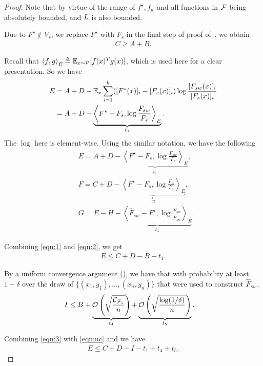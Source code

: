 \begin{proof}

Note that by virtue of the range of $f^\star, f_w$ and all functions in $\mathcal{F}$ being absolutely bounded, and $L$ is also bounded.

Due to $F^\star \notin V_s$, we replace $F^\star$ with $F_s$ in the final step of proof of~, we obtain
\begin{align}
    C \ge A + B. \label{eqn:1}
\end{align}

Recall that $\left \langle f,g \right \rangle_E \triangleq \mathbb{E}_{x \sim \mathcal{P}} [f(x)^Tg(x)]$, which is used here for a clear presentation. So we have
\begin{align*}
    E & = A + D - \mathbb{E}_x \sum_{i=1}^k ([F^\star(x)]_i-[F_s(x)]_i)\log \frac{[F_{sw}(x)]_i}{[F_s(x)]_i}
    \\ & = A + D - \underbrace{\left \langle F^\star-F_s, \log \frac{F_{sw}}{F_s} \right \rangle_E}_{t_1}.
\end{align*}
The $\log$ here is element-wise.
Using the similar notation, we have the following 
\begin{align}
    & E = A + D - \underbrace{\left \langle F^\star-F_s, \log \frac{F_{sw}}{F_s} \right \rangle_E}_{t_1}, \label{eqn:2}\\ 
    & F = C + D - \underbrace{\left \langle F^\star-F_s, \log \frac{F_w}{F_s} \right \rangle_E}_{t_2}, \label{eqn:2-1} \\
    & G = E - H - \underbrace{\left \langle \hat{F}_{sw}-F^\star, \log \frac{F_{sw}}{\hat{F}_{sw}} \right \rangle_E}_{t_3} \label{eqn:2-2}. 
\end{align}

Combining \eqref{eqn:1} and \eqref{eqn:2}, we get
\begin{align}
    E \le C + D - B - t_1. \label{eqn:3}
\end{align}

By a uniform convergence argument (), we have that with probability at least $1-\delta$ over the draw of $\{(x_1,y_1),\dots, (x_n,y_n)\}$ that were used to construct $\hat{F}_{sw}$,
\begin{align}
    I &\le B + \underbrace{\mathcal{O}\left(\sqrt{\frac{\mathcal{C}_{\mathcal{F}_s}}{n}}\right)}_{t_4} + \underbrace{\mathcal{O}\left(\sqrt{\frac{\log(1/\delta)}{n}}\right)}_{t_5}. \label{eqn:uc}
\end{align}

Combining \eqref{eqn:3} with \eqref{eqn:uc} and we have
\begin{align}
    E \le C + D - I - t_1 + t_4 + t_5. \label{eqn:4}
\end{align}


\end{proof}
